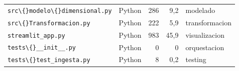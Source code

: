 \begin{longtable}{>{\raggedright\arraybackslash}p{6.2cm} l rr >{\raggedright\arraybackslash}p{3.0cm}}
    \texttt{src\textbackslash\{\}modelo\textbackslash\{\}dimensional.py} & Python & 286 & 9,2 & modelado \\
    \texttt{src\textbackslash\{\}Transformacion.py} & Python & 222 & 5,9 & transformacion \\
    \texttt{streamlit\_app.py} & Python & 983 & 45,9 & visualizacion \\
    \texttt{tests\textbackslash\{\}\_\_init\_\_.py} & Python & 0 & 0 & orquestacion \\
    \texttt{tests\textbackslash\{\}test\_ingesta.py} & Python & 8 & 0,2 & testing \\
\bottomrule
\end{longtable}
\endgroup
